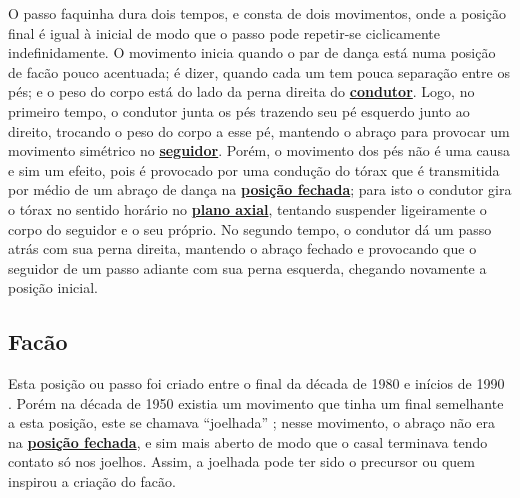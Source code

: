 O passo faquinha dura dois tempos, e consta de dois movimentos, 
onde a posição final é igual à inicial de modo que o passo pode repetir-se ciclicamente indefinidamente.
O movimento inicia quando o par de dança está numa posição de facão pouco acentuada;
é dizer, quando cada um tem pouca separação entre os pés; 
e o peso do corpo está do lado da perna direita do \hyperref[def:Condutor]{\textbf{condutor}}.
Logo, no primeiro tempo, 
o condutor junta os pés trazendo seu pé esquerdo junto ao direito, trocando o peso do corpo a esse pé,
mantendo o abraço para provocar um movimento simétrico no \hyperref[def:Seguidor]{\textbf{seguidor}}.
Porém, o movimento dos pés não é uma causa e sim um efeito,
pois é provocado por uma condução do tórax que é transmitida por médio de um abraço de dança na 
\hyperref[def:closed-position]{\textbf{posição fechada}};
para isto o condutor gira o tórax no sentido horário no \hyperref[def:PlanoAxial]{\textbf{plano axial}},
tentando suspender ligeiramente o corpo do seguidor e o seu próprio.
No segundo tempo, o condutor dá um passo atrás com sua perna direita,
 mantendo o abraço fechado e provocando que o seguidor de um passo adiante com sua perna esquerda,
chegando novamente a posição inicial.


\subsection{Facão}
\label{subsec:desc:passo:facao}

\caracterpostura{\CheckedItem}{\NoCheckedItem}
Esta posição ou passo foi  criado entre o final da década de 1980 e inícios de 1990  \cite[pp. 143]{perna2002samba}.
Porém na década de 1950 existia um movimento que tinha um final semelhante a esta posição, 
este se chamava ``joelhada'' \cite[pp. 160]{fornaciari1950aprender};
nesse movimento, o abraço não era na \hyperref[def:closed-position]{\textbf{posição fechada}},
e sim mais aberto de modo que o casal terminava tendo contato só nos joelhos.
Assim, a joelhada pode ter sido o precursor ou quem inspirou a criação do facão.

